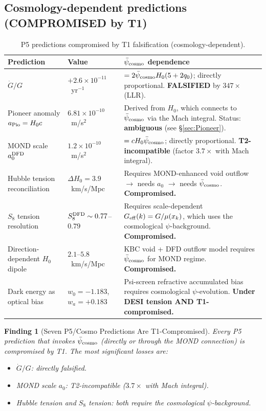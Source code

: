 \documentclass[11pt]{article}
\newtheorem{finding}{Finding}
\newcommand{\ee}[1]{\times 10^{#1}}
\newcommand{\psicosmo}{\bar{\psi}_{\rm cosmo}}
\newcommand{\Hzero}{H_0}
\begin{document}
\subsection{Cosmology-dependent predictions (COMPROMISED by T1)}

\begin{table}[h]
\centering
\caption{P5 predictions compromised by T1 falsification (cosmology-dependent).}
\label{tab:P5-compromised}
\begin{tabular}{p{4cm}p{3cm}p{5cm}}
\toprule
\textbf{Prediction} & \textbf{Value} & \textbf{$\psicosmo$ dependence} \\
\midrule
$\dot{G}/G$ & $+2.6\ee{-11}$~yr$^{-1}$ &
  $= 2\psicosmo\Hzero(5+2q_0)$; directly proportional.
  \textbf{FALSIFIED} by $347\times$ (LLR). \\
Pioneer anomaly $a_{\rm Pio} = \Hzero c$ & $6.81\ee{-10}$~m/s$^2$ &
  Derived from $\Hzero$, which connects to $\psicosmo$ via the Mach
  integral. Status: \textbf{ambiguous} (see \S\ref{sec:Pioneer}). \\
MOND scale $a_0^{\rm DFD}$ & $1.2\ee{-10}$~m/s$^2$ &
  $= c\Hzero\psicosmo$; directly proportional.
  \textbf{T2-incompatible} (factor $3.7\times$ with Mach integral). \\
Hubble tension reconciliation & $\Delta\Hzero = 3.9$~km/s/Mpc &
  Requires MOND-enhanced void outflow $\to$ needs $a_0$ $\to$
  needs $\psicosmo$. \textbf{Compromised.} \\
$S_8$ tension resolution & $S_8^{\rm DFD} \sim 0.77$--$0.79$ &
  Requires scale-dependent $G_{\rm eff}(k) = G/\mu(x_k)$,
  which uses the cosmological $\psi$-background.
  \textbf{Compromised.} \\
Direction-dependent $\Hzero$ dipole & $2.1$--$5.8$~km/s/Mpc &
  KBC void + DFD outflow model requires $\psicosmo$ for MOND regime.
  \textbf{Compromised.} \\
Dark energy as optical bias & $w_0 = -1.183$, $w_a = +0.183$ &
  Psi-screen refractive accumulated bias requires cosmological
  $\psi$-evolution. \textbf{Under DESI tension AND T1-compromised.} \\
\bottomrule
\end{tabular}
\end{table}

\begin{finding}[Seven P5/Cosmo Predictions Are T1-Compromised]
\label{find:P5-compromised}
Every P5 prediction that invokes $\psicosmo$ (directly or through the MOND
connection) is compromised by T1. The most significant losses are:
\begin{itemize}[nosep]
\item $\dot{G}/G$: directly falsified.
\item MOND scale $a_0$: T2-incompatible ($3.7\times$ with Mach integral).
\item Hubble tension and $S_8$ tension: both require the cosmological $\psi$-background.
\end{itemize}
\end{finding}
\end{document}
